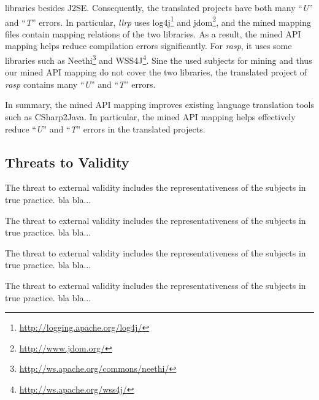 libraries besides J2SE. Consequently, the translated projects have
both many ``\emph{U}'' and ``\emph{T}'' errors. In particular,
\emph{llrp} uses
log4j\footnote{\url{http://logging.apache.org/log4j/}} and
jdom\footnote{\url{http://www.jdom.org/}}, and the mined mapping
files contain mapping relations of the two libraries. As a result,
the mined API mapping helps reduce compilation errors significantly.
For \emph{rasp}, it uses some libraries such as
Neethi\footnote{\url{http://ws.apache.org/commons/neethi/}} and
WSS4J\footnote{\url{http://ws.apache.org/wss4j/}}. Sine the used
subjects for mining and thus our mined API mapping do not cover the
two libraries, the translated project of \emph{rasp} contains many
``\emph{U}'' and ``\emph{T}'' errors.

In summary, the mined API mapping improves existing language
translation tools such as CSharp2Java. In particular, the mined API
mapping helps effectively reduce ``\emph{U}'' and ``\emph{T}''
errors in the translated projects.


\subsection{Threats to Validity}
\label{sec:evaluation:threats} The threat to external validity
includes the representativeness of the subjects in true practice.
bla bla...

The threat to external validity includes the representativeness of
the subjects in true practice. bla bla...

The threat to external validity includes the representativeness of
the subjects in true practice. bla bla...

The threat to external validity includes the representativeness of
the subjects in true practice. bla bla...
